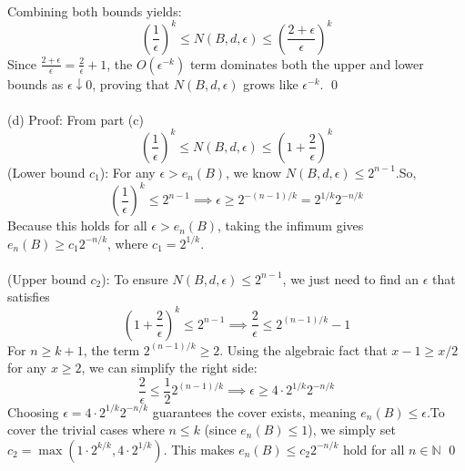 \documentclass{article}
\begin{document}
\\
Combining both bounds yields:$$\left(\frac{1}{\epsilon}\right)^k \leq N(B, d, \epsilon) \leq \left(\frac{2 + \epsilon}{\epsilon}\right)^k$$Since $\frac{2+\epsilon}{\epsilon} = \frac{2}{\epsilon} + 1$, the $O(\epsilon^{-k})$ term dominates both the upper and lower bounds as $\epsilon \downarrow 0$, proving that $N(B, d, \epsilon)$ grows like $\epsilon^{-k}$. \qed
\\
\\
(d) 
Proof: 
From part (c)$$\left(\frac{1}{\epsilon}\right)^k \leq N(B, d, \epsilon) \leq \left(1 + \frac{2}{\epsilon}\right)^k$$(Lower bound $c_1$): For any $\epsilon > e_n(B)$, we know $N(B, d, \epsilon) \leq 2^{n-1}$.So, $$\left(\frac{1}{\epsilon}\right)^k \leq 2^{n-1} \implies \epsilon \geq 2^{-(n-1)/k} = 2^{1/k} 2^{-n/k}$$Because this holds for all $\epsilon > e_n(B)$, taking the infimum gives $e_n(B) \geq c_1 2^{-n/k}$, where $c_1 = 2^{1/k}$. \\
\\
(Upper bound $c_2$): To ensure $N(B, d, \epsilon) \leq 2^{n-1}$, we just need to find an $\epsilon$ that satisfies $$\left(1 + \frac{2}{\epsilon}\right)^k \leq 2^{n-1} \implies \frac{2}{\epsilon} \leq 2^{(n-1)/k} - 1$$For $n \geq k + 1$, the term $2^{(n-1)/k} \geq 2$. Using the algebraic fact that $x - 1 \geq x/2$ for any $x \geq 2$, we can simplify the right side:$$\frac{2}{\epsilon} \leq \frac{1}{2} 2^{(n-1)/k} \implies \epsilon \geq 4 \cdot 2^{1/k} 2^{-n/k}$$Choosing $\epsilon = 4 \cdot 2^{1/k} 2^{-n/k}$ guarantees the cover exists, meaning $e_n(B) \leq \epsilon$.To cover the trivial cases where $n \leq k$ (since $e_n(B) \leq 1$), we simply set $c_2 = \max(1 \cdot 2^{k/k}, 4 \cdot 2^{1/k})$. This makes $e_n(B) \leq c_2 2^{-n/k}$ hold for all $n \in \mathbb{N}$
\qed
\end{document}
